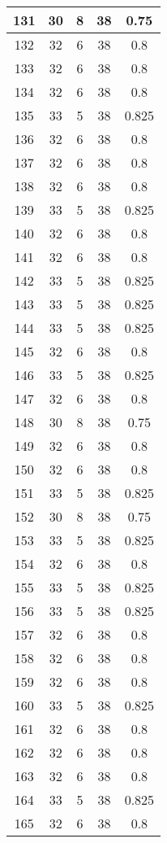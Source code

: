 \documentclass[letterpaper, 12pt]{article}
\begin{document}
\begin{longtable}{|c|c|c|c|c|}
\hline
131 & 30 & 8 & 38 & 0.75 \\
\hline
132 & 32 & 6 & 38 & 0.8 \\
\hline
133 & 32 & 6 & 38 & 0.8 \\
\hline
134 & 32 & 6 & 38 & 0.8 \\
\hline
135 & 33 & 5 & 38 & 0.825 \\
\hline
136 & 32 & 6 & 38 & 0.8 \\
\hline
137 & 32 & 6 & 38 & 0.8 \\
\hline
138 & 32 & 6 & 38 & 0.8 \\
\hline
139 & 33 & 5 & 38 & 0.825 \\
\hline
140 & 32 & 6 & 38 & 0.8 \\
\hline
141 & 32 & 6 & 38 & 0.8 \\
\hline
142 & 33 & 5 & 38 & 0.825 \\
\hline
143 & 33 & 5 & 38 & 0.825 \\
\hline
144 & 33 & 5 & 38 & 0.825 \\
\hline
145 & 32 & 6 & 38 & 0.8 \\
\hline
146 & 33 & 5 & 38 & 0.825 \\
\hline
147 & 32 & 6 & 38 & 0.8 \\
\hline
148 & 30 & 8 & 38 & 0.75 \\
\hline
149 & 32 & 6 & 38 & 0.8 \\
\hline
150 & 32 & 6 & 38 & 0.8 \\
\hline
151 & 33 & 5 & 38 & 0.825 \\
\hline
152 & 30 & 8 & 38 & 0.75 \\
\hline
153 & 33 & 5 & 38 & 0.825 \\
\hline
154 & 32 & 6 & 38 & 0.8 \\
\hline
155 & 33 & 5 & 38 & 0.825 \\
\hline
156 & 33 & 5 & 38 & 0.825 \\
\hline
157 & 32 & 6 & 38 & 0.8 \\
\hline
158 & 32 & 6 & 38 & 0.8 \\
\hline
159 & 32 & 6 & 38 & 0.8 \\
\hline
160 & 33 & 5 & 38 & 0.825 \\
\hline
161 & 32 & 6 & 38 & 0.8 \\
\hline
162 & 32 & 6 & 38 & 0.8 \\
\hline
163 & 32 & 6 & 38 & 0.8 \\
\hline
164 & 33 & 5 & 38 & 0.825 \\
\hline
165 & 32 & 6 & 38 & 0.8 \\

\end{longtable}
\end{document}
